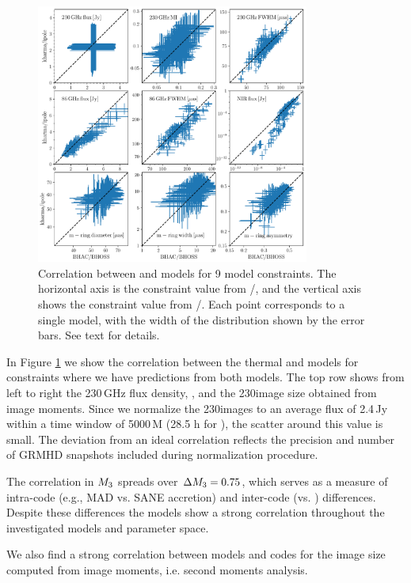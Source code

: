 \begin{figure}
  \centering
  \includegraphics[width=0.8\textwidth]{./figures/BHAC_iharm_correlationNew}
  \caption{Correlation between \bhac and \kharma models for 9 model constraints.
The horizontal axis is the constraint value from \bhac/\bhoss, and the vertical axis shows the constraint value from \kharma/\ipole.
Each point corresponds to a single model, with the width of the distribution shown by the error bars.
See text for details.}
  \label{fig:modelcorrelation}
\end{figure}

In Figure \ref{fig:modelcorrelation} we show the correlation between the thermal \kharma and \bhac models for constraints where we have predictions from both models.
The top row shows from left to right the 230\,GHz flux density, , and the 230\GHz image size obtained from image moments.
Since we normalize the 230\GHz images to an average flux of 2.4\,Jy within a time window of 5000\,M (28.5 h for \sgra), the scatter around this value is small.
The deviation from an ideal correlation reflects the precision and number of GRMHD snapshots included during normalization procedure.

The correlation in $M_{3}$ spreads over $\Delta M_{3}=0.75$, which serves as a measure of intra-code (e.g., MAD vs. SANE accretion) and inter-code (\bhac vs. \kharma) differences.
Despite these differences the models show a strong correlation throughout the investigated models and parameter space.

We also find a strong correlation between models and codes for the image size computed from image moments, i.e. second moments analysis.

